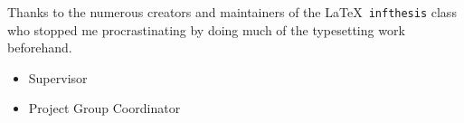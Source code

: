 \begin{acknowledgements}  
Thanks to the numerous creators and maintainers of the \LaTeX\ \texttt{infthesis} class who stopped me procrastinating by doing much of the typesetting work beforehand.


\begin{itemize}
	\item Supervisor
	\item Project Group Coordinator
\end{itemize}

\end{acknowledgements}